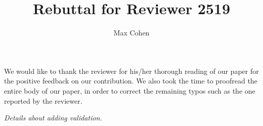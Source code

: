 \documentclass{article}
\title{Rebuttal for Reviewer 2519}
\author{Max Cohen}
\affil{Samovar, T\'el\'ecom SudParis, CITI, TIPIC, Institut Polyechnique de Paris}
\date{}
\begin{document}
\maketitle

We would like to thank the reviewer for his/her thorough reading of our paper for the positive feedback on our contribution. We also took the time to proofread the entire body of our paper, in order to correct the remaining typos such as the one reported by the reviewer.

\textit{Details about adding validation.} 





\end{document}
